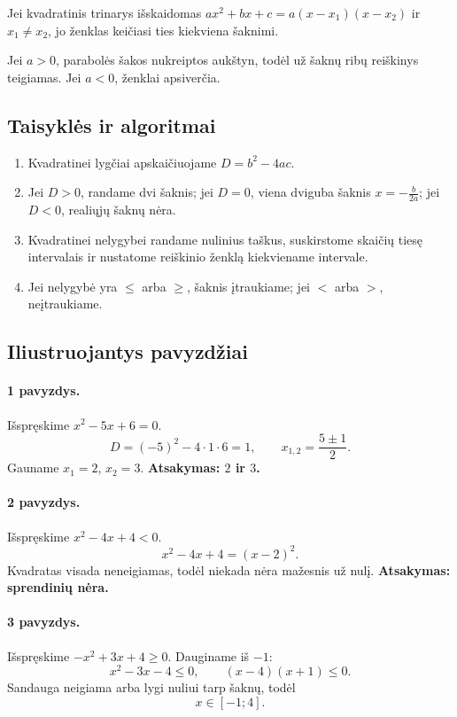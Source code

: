 \begin{savybe}
Jei kvadratinis trinarys išskaidomas $ax^2+bx+c=a(x-x_1)(x-x_2)$ ir $x_1\ne x_2$, jo ženklas keičiasi ties kiekviena šaknimi.
\end{savybe}

\begin{savybe}
Jei $a>0$, parabolės šakos nukreiptos aukštyn, todėl už šaknų ribų reiškinys teigiamas. Jei $a<0$, ženklai apsiverčia.
\end{savybe}

\subsection{Taisyklės ir algoritmai}

\begin{enumerate}
\item Kvadratinei lygčiai apskaičiuojame $D=b^2-4ac$.
\item Jei $D>0$, randame dvi šaknis; jei $D=0$, viena dviguba šaknis $x=-\frac{b}{2a}$; jei $D<0$, realiųjų šaknų nėra.
\item Kvadratinei nelygybei randame nulinius taškus, suskirstome skaičių tiesę intervalais ir nustatome reiškinio ženklą kiekviename intervale.
\item Jei nelygybė yra $\le$ arba $\ge$, šaknis įtraukiame; jei $<$ arba $>$, neįtraukiame.
\end{enumerate}

\subsection{Iliustruojantys pavyzdžiai}

\paragraph{1 pavyzdys.}
Išspręskime $x^2-5x+6=0$.
\[
D=(-5)^2-4\cdot1\cdot6=1,\qquad x_{1,2}=\frac{5\pm1}{2}.
\]
Gauname $x_1=2$, $x_2=3$. \textbf{Atsakymas: $2$ ir $3$.}

\paragraph{2 pavyzdys.}
Išspręskime $x^2-4x+4<0$.
\[
x^2-4x+4=(x-2)^2.
\]
Kvadratas visada neneigiamas, todėl niekada nėra mažesnis už nulį. \textbf{Atsakymas: sprendinių nėra.}

\paragraph{3 pavyzdys.}
Išspręskime $-x^2+3x+4\ge0$.
Dauginame iš $-1$:
\[
x^2-3x-4\le0,\qquad (x-4)(x+1)\le0.
\]
Sandauga neigiama arba lygi nuliui tarp šaknų, todėl
\[
x\in[-1;4].
\]

